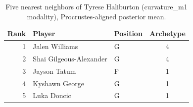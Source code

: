 \begin{table}[htbp]
  \centering\small
  \begin{tabular}{rllc}
    \toprule
    Rank & Player & Position & Archetype \\
    \midrule
    1 & Jalen Williams & G & 4 \\
    2 & Shai Gilgeous-Alexander & G & 4 \\
    3 & Jayson Tatum & F & 1 \\
    4 & Kyshawn George & G & 1 \\
    5 & Luka Doncic & G & 1 \\
    \bottomrule
  \end{tabular}
  \caption{Five nearest neighbors of Tyrese Haliburton (curvature_m1 modality), Procrustes-aligned posterior mean.}
  \label{tab:Tyrese_Haliburton_neighbors_curvature_m1}
\end{table}

